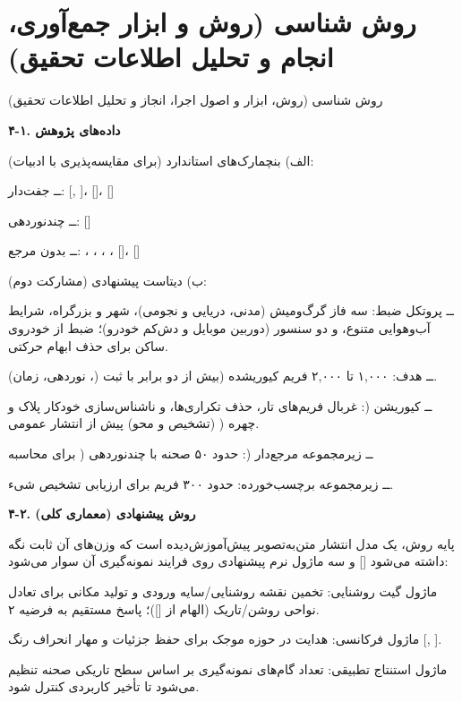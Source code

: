 \documentclass[12pt,a4paper]{article}
\begin{document}
\section{روش شناسی (روش و ابزار جمع‌آوری، انجام و تحلیل اطلاعات تحقیق)}
روش شناسی (روش، ابزار و اصول اجرا، انجاز و تحلیل اطلاعات تحقیق)\par
\textbf{۴-۱. داده‌های پژوهش}\par
الف) بنچمارک‌های استاندارد (برای مقایسه‌پذیری با ادبیات):\par
ــ جفت‌دار:  [, ]،  []،  []\par
ــ چندنوردهی:  []\par
ــ بدون مرجع: ، ، ، ،  []،  []\par
ب) دیتاست پیشنهادی  (مشارکت دوم):\par
ــ پروتکل ضبط: سه فاز گرگ‌ومیش (مدنی، دریایی و نجومی)، شهر و بزرگراه، شرایط آب‌وهوایی متنوع، و دو سنسور (دوربین موبایل و دش‌کم خودرو)؛ ضبط از خودروی ساکن برای حذف ابهام حرکتی.\par
ــ هدف: ۱,۰۰۰ تا ۲,۰۰۰ فریم کیوریشده (بیش از دو برابر  با ثبت  (، نوردهی، زمان).\par
ــ کیوریشن (: غربال فریم‌های تار، حذف تکراری‌ها، و ناشناس‌سازی خودکار پلاک و چهره ( (تشخیص و محو) پیش از انتشار عمومی.\par
ــ زیرمجموعه مرجع‌دار (: حدود ۵۰ صحنه با  چندنوردهی ( برای محاسبه \par
ــ زیرمجموعه برچسب‌خورده: حدود ۳۰۰ فریم برای ارزیابی تشخیص شیء.\par
\textbf{۴-۲. روش پیشنهادی (معماری کلی)}\par
پایه روش، یک مدل انتشار متن‌به‌تصویر پیش‌آموزش‌دیده است که وزن‌های آن ثابت نگه داشته می‌شود [] و سه ماژول نرم پیشنهادی روی فرایند نمونه‌گیری آن سوار می‌شود:\par
{} ماژول گیت روشنایی: تخمین نقشه روشنایی/سایه ورودی و تولید  مکانی برای تعادل نواحی روشن/تاریک (الهام از [])؛ پاسخ مستقیم به فرضیه ۲.\par
{} ماژول  فرکانسی: هدایت در حوزه موجک برای حفظ جزئیات و مهار انحراف رنگ [, ].\par
{} ماژول استنتاج تطبیقی: تعداد گام‌های نمونه‌گیری بر اساس سطح تاریکی صحنه تنظیم می‌شود تا تأخیر کاربردی کنترل شود.\par
\end{document}
